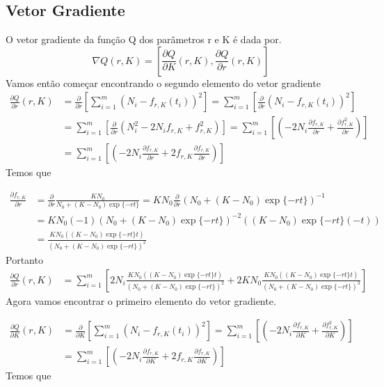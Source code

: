 \documentclass[a4paper,12pt,twoside]{article}
\begin{document}
\subsection{Vetor Gradiente}
O vetor gradiente da função Q dos parâmetros r e K é dada por.
\begin{equation}
\nabla Q(r,K)=\left[\frac{\partial Q}{\partial K}(r,K),\frac{\partial Q}{\partial r}(r,K) \right]
\end{equation}
Vamos então começar encontrando o segundo elemento do vetor gradiente
\begin{align*}
\frac{\partial Q}{\partial r}(r,K)&=\frac{\partial }{\partial r}\left[\sum_{i=1}^{m}(N_i - f_{r,K}(t_i))^2 \right] = \sum_{i=1}^{m}\left[\frac{\partial }{\partial r}(N_i - f_{r,K}(t_i))^2 \right]\\
&=\sum_{i=1}^{m}\left[\frac{\partial }{\partial r}(N_i^2-2N_i f_{r,K} + f_{r,K}^2) \right]=\sum_{i=1}^{m}\left[(-2N_i\frac{\partial  f_{r,K}}{\partial r} + \frac{\partial  f_{r,K}^2}{\partial r}) \right]\\
&= \sum_{i=1}^{m}\left[(-2N_i\frac{\partial  f_{r,K}}{\partial r} + 2f_{r,K}\frac{\partial  f_{r,K}}{\partial r} ) \right]
\end{align*}
Temos que 

\begin{align*}
\frac{\partial  f_{r,K}}{\partial r}&=\frac{\partial}{\partial r}\frac{KN_0}{N_0 + (K-N_0)\exp{\{-rt\}}}=KN_0 \frac{\partial}{\partial r}(N_0 + (K-N_0)\exp{\{-rt\}})^{-1}\\
&= KN_0(-1)(N_0 + (K-N_0)\exp{\{-rt\}})^{-2}((K-N_0)\exp{\{-rt\}}(-t))\\
&=\frac{KN_0((K-N_0)\exp{\{-rt\}}t)}{(N_0 + (K-N_0)\exp{\{-rt\}})^{2}}
\end{align*}
Portanto 
\begin{align*}
\frac{\partial Q}{\partial r}(r,K)&=\sum_{i=1}^{m}\left[ 2N_i \frac{KN_0((K-N_0)\exp{\{-rt\}}t)}{(N_0 + (K-N_0)\exp{\{-rt\}})^{2}} + 2KN_0\frac{KN_0((K-N_0)\exp{\{-rt\}}t)}{(N_0 + (K-N_0)\exp{\{-rt\}})^{3}} \right]
\end{align*}
\newpage
\restoregeometry
Agora vamos encontrar o primeiro elemento do vetor gradiente.

\begin{align*}
\frac{\partial Q}{\partial K}(r,K)&=\frac{\partial }{\partial K}\left[\sum_{i=1}^{m}(N_i - f_{r,K}(t_i))^2 \right]=\sum_{i=1}^{m}\left[(-2N_i\frac{\partial  f_{r,K}}{\partial K} + \frac{\partial  f_{r,K}^2}{\partial K}) \right]\\
&= \sum_{i=1}^{m}\left[(-2N_i\frac{\partial  f_{r,K}}{\partial K} + 2f_{r,K}\frac{\partial  f_{r,K}}{\partial K} ) \right]
\end{align*}
Temos que
\end{document}

